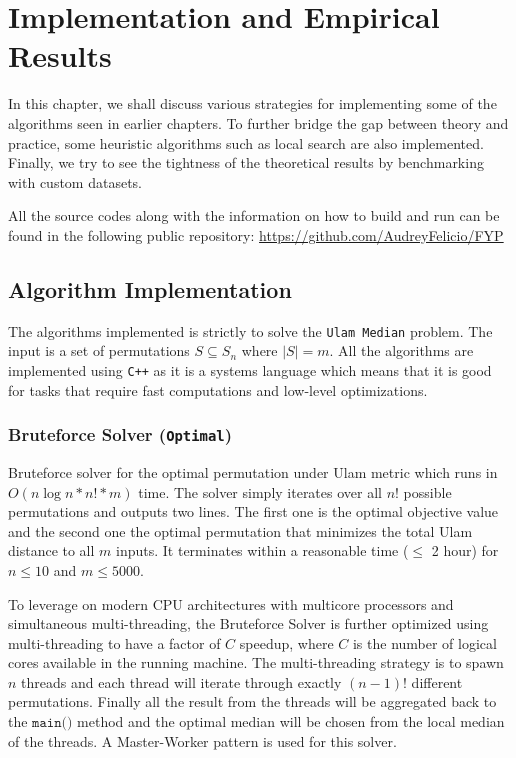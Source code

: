 \chapter{Implementation and Empirical Results}

In this chapter, we shall discuss various strategies for implementing some of the algorithms seen in earlier chapters. To further bridge the gap between theory and practice, some heuristic algorithms such as local search are also implemented. Finally, we try to see the tightness of the theoretical results by benchmarking with custom datasets.

All the source codes along with the information on how to build and run can be found in the following public repository: \url{https://github.com/AudreyFelicio/FYP}

\section{Algorithm Implementation}
The algorithms implemented is strictly to solve the \texttt{Ulam Median} problem. The input is a set of permutations $S \subseteq S_n$ where $|S| = m$. All the algorithms are implemented using \texttt{C++} as it is a systems language which means that it is good for tasks that require fast computations and low-level optimizations.

\subsection{Bruteforce Solver (\texttt{Optimal})}
Bruteforce solver for the optimal permutation under Ulam metric which runs in $O(n \log n * n! * m)$ time. The solver simply iterates over all $n!$ possible permutations and outputs two lines. The first one is the optimal objective value and the second one the optimal permutation that minimizes the total Ulam distance to all $m$ inputs. It terminates within a reasonable time ($\leq$ 2 hour) for $n \leq 10$ and $m \leq 5000$. 

To leverage on modern CPU architectures with multicore processors and simultaneous multi-threading, the Bruteforce Solver is further optimized using multi-threading to have a factor of $C$ speedup, where $C$ is the number of logical cores available in the running machine. The multi-threading strategy is to spawn $n$ threads and each thread will iterate through exactly $(n - 1)!$ different permutations. Finally all the result from the threads will be aggregated back to the $\texttt{main()}$ method and the optimal median will be chosen from the local median of the threads. A Master-Worker pattern is used for this solver.

